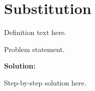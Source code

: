 \section{Substitution}


\begin{definition}[Term]
Definition text here.
\end{definition}

\begin{example}
Problem statement.

\textbf{Solution:}

Step-by-step solution here.
\end{example}
